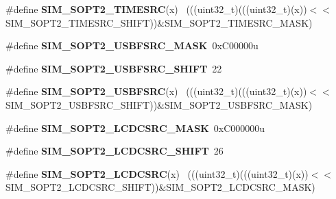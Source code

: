 \begin{DoxyCompactItemize}
\item 
\hypertarget{group___s_i_m___register___masks_ga270953dc4dd918f6d72f992770acb6bb}{}\#define {\bfseries S\+I\+M\+\_\+\+S\+O\+P\+T2\+\_\+\+T\+I\+M\+E\+S\+R\+C}(x)                                      ~(((uint32\+\_\+t)(((uint32\+\_\+t)(x))$<$$<$S\+I\+M\+\_\+\+S\+O\+P\+T2\+\_\+\+T\+I\+M\+E\+S\+R\+C\+\_\+\+S\+H\+I\+F\+T))\&S\+I\+M\+\_\+\+S\+O\+P\+T2\+\_\+\+T\+I\+M\+E\+S\+R\+C\+\_\+\+M\+A\+S\+K)\label{group___s_i_m___register___masks_ga270953dc4dd918f6d72f992770acb6bb}

\item 
\hypertarget{group___s_i_m___register___masks_ga9eb6b952be10ec2226926d85e3961d43}{}\#define {\bfseries S\+I\+M\+\_\+\+S\+O\+P\+T2\+\_\+\+U\+S\+B\+F\+S\+R\+C\+\_\+\+M\+A\+S\+K}~0x\+C00000u\label{group___s_i_m___register___masks_ga9eb6b952be10ec2226926d85e3961d43}

\item 
\hypertarget{group___s_i_m___register___masks_ga69d656bf8b92ff31da39850c30f78f69}{}\#define {\bfseries S\+I\+M\+\_\+\+S\+O\+P\+T2\+\_\+\+U\+S\+B\+F\+S\+R\+C\+\_\+\+S\+H\+I\+F\+T}~22\label{group___s_i_m___register___masks_ga69d656bf8b92ff31da39850c30f78f69}

\item 
\hypertarget{group___s_i_m___register___masks_ga241fb24ddd39b3cb1409da31e40a5f49}{}\#define {\bfseries S\+I\+M\+\_\+\+S\+O\+P\+T2\+\_\+\+U\+S\+B\+F\+S\+R\+C}(x)                                      ~(((uint32\+\_\+t)(((uint32\+\_\+t)(x))$<$$<$S\+I\+M\+\_\+\+S\+O\+P\+T2\+\_\+\+U\+S\+B\+F\+S\+R\+C\+\_\+\+S\+H\+I\+F\+T))\&S\+I\+M\+\_\+\+S\+O\+P\+T2\+\_\+\+U\+S\+B\+F\+S\+R\+C\+\_\+\+M\+A\+S\+K)\label{group___s_i_m___register___masks_ga241fb24ddd39b3cb1409da31e40a5f49}

\item 
\hypertarget{group___s_i_m___register___masks_gad42a02dc1f0128c877617d2293633ae3}{}\#define {\bfseries S\+I\+M\+\_\+\+S\+O\+P\+T2\+\_\+\+L\+C\+D\+C\+S\+R\+C\+\_\+\+M\+A\+S\+K}~0x\+C000000u\label{group___s_i_m___register___masks_gad42a02dc1f0128c877617d2293633ae3}

\item 
\hypertarget{group___s_i_m___register___masks_gac251ccb49b7604aba95781d7859908d2}{}\#define {\bfseries S\+I\+M\+\_\+\+S\+O\+P\+T2\+\_\+\+L\+C\+D\+C\+S\+R\+C\+\_\+\+S\+H\+I\+F\+T}~26\label{group___s_i_m___register___masks_gac251ccb49b7604aba95781d7859908d2}

\item 
\hypertarget{group___s_i_m___register___masks_gaf3403d02810a5d94a2db2a458ba0bb4b}{}\#define {\bfseries S\+I\+M\+\_\+\+S\+O\+P\+T2\+\_\+\+L\+C\+D\+C\+S\+R\+C}(x)                                      ~(((uint32\+\_\+t)(((uint32\+\_\+t)(x))$<$$<$S\+I\+M\+\_\+\+S\+O\+P\+T2\+\_\+\+L\+C\+D\+C\+S\+R\+C\+\_\+\+S\+H\+I\+F\+T))\&S\+I\+M\+\_\+\+S\+O\+P\+T2\+\_\+\+L\+C\+D\+C\+S\+R\+C\+\_\+\+M\+A\+S\+K)\label{group___s_i_m___register___masks_gaf3403d02810a5d94a2db2a458ba0bb4b}


\end{DoxyCompactItemize}
